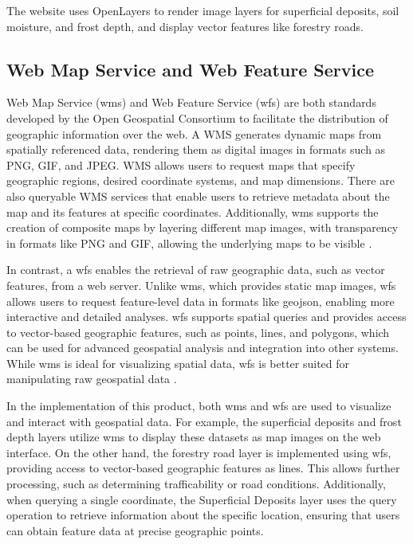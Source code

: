 The website uses OpenLayers to render image layers for \gls{superficial deposit}s, soil moisture, and \gls{frost} depth, and display vector features like forestry roads.  

\subsection{Web Map Service and Web Feature Service}

Web Map Service (\Gls{wms}) and Web Feature Service (\Gls{wfs}) are both standards developed by the Open Geospatial Consortium to facilitate the distribution of geographic information over the web. A WMS generates dynamic maps from spatially referenced data, rendering them as digital images in formats such as PNG, GIF, and JPEG. WMS allows users to request maps that specify geographic regions, desired coordinate systems, and map dimensions. There are also queryable WMS services that enable users to retrieve metadata about the map and its features at specific coordinates. Additionally, \Gls{wms} supports the creation of composite maps by layering different map images, with transparency in formats like PNG and GIF, allowing the underlying maps to be visible \cite{ogc2006wms}.

In contrast, a \Gls{wfs} enables the retrieval of raw geographic data, such as vector features, from a web server. Unlike \Gls{wms}, which provides static map images, \Gls{wfs} allows users to request feature-level data in formats like \Gls{geojson}, enabling more interactive and detailed analyses. \Gls{wfs} supports spatial queries and provides access to vector-based geographic features, such as points, lines, and polygons, which can be used for advanced geospatial analysis and integration into other systems. While \Gls{wms} is ideal for visualizing spatial data, \Gls{wfs} is better suited for manipulating raw geospatial data \cite{ogc2005wfs}.

In the implementation of this product, both \Gls{wms} and \Gls{wfs} are used to visualize and interact with geospatial data. For example, the superficial deposits and frost depth layers utilize \Gls{wms} to display these datasets as map images on the web interface. On the other hand, the forestry road layer is implemented using \Gls{wfs}, providing access to vector-based geographic features as lines. This allows further processing, such as determining \gls{trafficability} or road conditions. Additionally, when querying a single coordinate, the Superficial Deposits layer uses the query operation to retrieve information about the specific location, ensuring that users can obtain feature data at precise geographic points.

